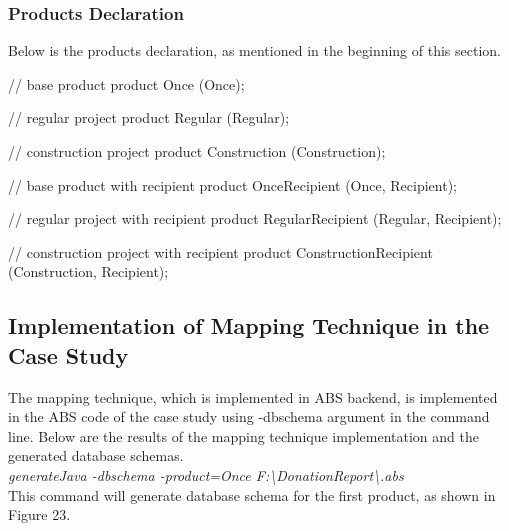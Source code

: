 \documentclass[runningheads,a4paper]{llncs}
\begin{document}
\subsubsection{Products Declaration}
Below is the products declaration, as mentioned in the beginning of this section.

\begin{abscode}
// base product
product Once (Once);

// regular project
product Regular (Regular);

// construction project
product Construction (Construction);

// base product with recipient
product OnceRecipient (Once, Recipient);

// regular project with recipient
product RegularRecipient (Regular, Recipient);

// construction project with recipient
product ConstructionRecipient (Construction, Recipient);
\end{abscode}


\subsection{Implementation of Mapping Technique in the Case Study}
The mapping technique, which is implemented in ABS backend, is implemented in the ABS code of the case study using -dbschema argument in the command line. Below are the results of the mapping technique implementation and the generated database schemas.\\

\emph{generateJava -dbschema -product=Once F:\textbackslash DonationReport\textbackslash *.abs}\\

This command will generate database schema for the first product, as shown in Figure 23.\\
\end{document}
